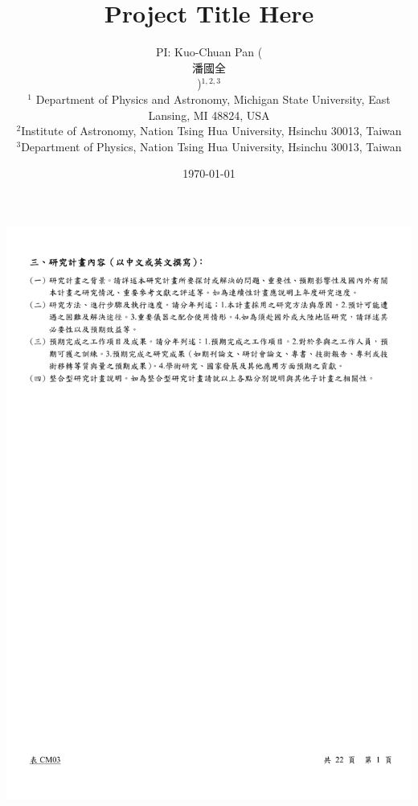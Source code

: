 \documentclass[12pt, a4paper]{article}
\newcommand{\cntext}[1]{\begin{CJK*}{UTF8}{bkai}#1\end{CJK*}}
\begin{document}
\includegraphics[trim=1.5cm 0 0 3cm]{cover.pdf}
\thispagestyle{titlepage}

\clearpage
\title{\Large \vspace{-2.5cm} Project Title Here}

\author{\small PI: Kuo-Chuan Pan (\cntext{潘國全})$^{1,2,3}$\\
{\footnotesize $^1$ Department of Physics and Astronomy, Michigan State University, East Lansing, MI 48824, USA}\\
{\footnotesize $^2$Institute of Astronomy, Nation Tsing Hua University, Hsinchu 30013, Taiwan}\\ 
{\footnotesize $^3$Department of Physics, Nation Tsing Hua University, Hsinchu 30013, Taiwan}}
\date{\small \today}

\maketitle
\thispagestyle{titlepage}
\end{document}
